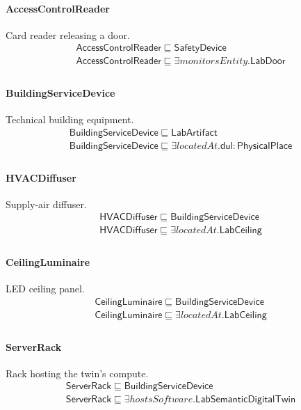 \documentclass[10pt]{article}
\begin{document}
\paragraph{AccessControlReader} Card reader releasing a door.
\[\begin{array}{l}
\mathsf{AccessControlReader} \sqsubseteq  \mathsf{SafetyDevice} \\
\mathsf{AccessControlReader} \sqsubseteq  \exists \mathit{monitorsEntity}.\mathsf{LabDoor} \\
\end{array}\]
\paragraph{BuildingServiceDevice} Technical building equipment.
\[\begin{array}{l}
\mathsf{BuildingServiceDevice} \sqsubseteq  \mathsf{LabArtifact} \\
\mathsf{BuildingServiceDevice} \sqsubseteq  \exists \mathit{locatedAt}.\mathsf{dul{:}PhysicalPlace} \\
\end{array}\]
\paragraph{HVACDiffuser} Supply-air diffuser.
\[\begin{array}{l}
\mathsf{HVACDiffuser} \sqsubseteq  \mathsf{BuildingServiceDevice} \\
\mathsf{HVACDiffuser} \sqsubseteq  \exists \mathit{locatedAt}.\mathsf{LabCeiling} \\
\end{array}\]
\paragraph{CeilingLuminaire} LED ceiling panel.
\[\begin{array}{l}
\mathsf{CeilingLuminaire} \sqsubseteq  \mathsf{BuildingServiceDevice} \\
\mathsf{CeilingLuminaire} \sqsubseteq  \exists \mathit{locatedAt}.\mathsf{LabCeiling} \\
\end{array}\]
\paragraph{ServerRack} Rack hosting the twin's compute.
\[\begin{array}{l}
\mathsf{ServerRack} \sqsubseteq  \mathsf{BuildingServiceDevice} \\
\mathsf{ServerRack} \sqsubseteq  \exists \mathit{hostsSoftware}.\mathsf{LabSemanticDigitalTwin} \\
\end{array}\]
\end{document}
